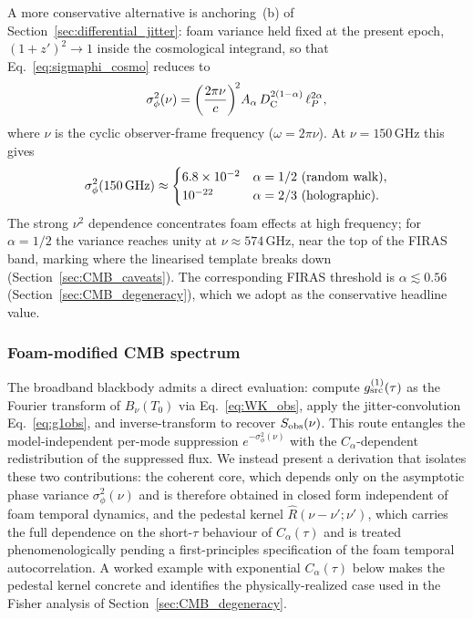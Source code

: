\documentclass[aps,prd,onecolumn,amsmath,amssymb]{revtex4-2}
\begin{document}
A more conservative alternative is anchoring~(b) of
Section~\ref{sec:differential_jitter}: foam variance held fixed at the
present epoch, $(1+z')^2\to 1$ inside the cosmological integrand, so
that Eq.~\eqref{eq:sigmaphi_cosmo} reduces to
\begin{equation}
  \sigma_\phi^2(\nu)
    = \left(\frac{2\pi\nu}{c}\right)^{\!2}\!
      A_\alpha\,D_{\rm C}^{2(1-\alpha)}\,\ell_P^{2\alpha},
  \label{eq:sigma_phi_CMB}
\end{equation}
where $\nu$ is the cyclic observer-frame frequency ($\omega=2\pi\nu$).
At $\nu=150$\,GHz this gives
\begin{equation}
  \sigma_\phi^2(150\,{\rm GHz})\approx
  \begin{cases}
    6.8\times10^{-2} & \alpha=1/2\ \text{(random walk)},\\
    10^{-22}         & \alpha=2/3\ \text{(holographic)}.
  \end{cases}
  \label{eq:sigma_phi_CMB_values}
\end{equation}
The strong $\nu^2$ dependence concentrates foam effects at high
frequency; for $\alpha=1/2$ the variance reaches unity at
$\nu\approx 574$\,GHz, near the top of the FIRAS band, marking where
the linearised template breaks down (Section~\ref{sec:CMB_caveats}).
The corresponding FIRAS threshold is $\alpha\lesssim 0.56$
(Section~\ref{sec:CMB_degeneracy}), which we adopt as the conservative
headline value.

\subsubsection{Foam-modified CMB spectrum}
\label{sec:CMB_derivation}

The broadband blackbody admits a direct evaluation: compute
$g^{(1)}_{\rm src}(\tau)$ as the Fourier transform of $B_\nu(T_0)$
via Eq.~\eqref{eq:WK_obs}, apply the jitter-convolution
Eq.~\eqref{eq:g1obs}, and inverse-transform to recover
$S_{\rm obs}(\nu)$.  This route entangles the model-independent
per-mode suppression $e^{-\sigma_\phi^2(\nu)}$ with the
$C_\alpha$-dependent redistribution of the suppressed flux.  We
instead present a derivation that isolates these two contributions:
the coherent core, which depends only on the asymptotic phase
variance $\sigma_\phi^2(\nu)$ and is therefore obtained in closed
form independent of foam temporal dynamics, and the pedestal kernel
$\hat{R}(\nu-\nu';\nu')$, which carries the full dependence on the
short-$\tau$ behaviour of $C_\alpha(\tau)$ and is treated
phenomenologically pending a first-principles specification of the
foam temporal autocorrelation.  A worked example with exponential
$C_\alpha(\tau)$ below makes the pedestal kernel concrete and
identifies the physically-realized case used in the Fisher analysis
of Section~\ref{sec:CMB_degeneracy}.
\end{document}
